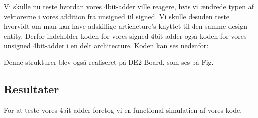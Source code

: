 \documentclass[../journal2.tex]{subfiles}
\begin{document}

Vi skulle nu teste hvordan vores 4bit-adder ville reagere, hvis vi ændrede typen af vektorerne i vores addition fra unsigned til signed. Vi skulle desuden teste hvorvidt om man kan have adskillige articheture's knyttet til den samme design entity. Derfor indeholder koden for vores signed 4bit-adder også koden for vores unsigned 4bit-adder i en delt architecture. Koden kan ses nedenfor:


Denne strukturer blev også realiseret på DE2-Board, som ses på Fig.




\subsection{Resultater}
For at teste vores 4bit-adder foretog vi en functional simulation af vores kode. 
\end{document}
